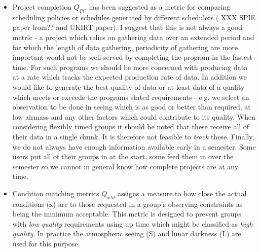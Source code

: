 \begin{itemize}
\item Project completion $Q_{PC}$ has been suggested as a metric for comparing scheduling policies or schedules generated by different schedulers ( XXX SPIE paper from?? and UKIRT paper). I suggest that this is not always a good metric - a project which relies on gathering data over an extended period and for which the length of data gathering, periodicity of gathering are more important would not be well served by completing the program in the fastest time. For such programs we should be more concerned with producing data at a rate which tracks the expected production rate of data. In addition we would like to generate the best quality of data or at least data of a quality which meets or exceeds the programs stated requirements - e.g. we select an observation to be done in seeing which is as good or better than required, at low airmass and any other factors which could contribute to its quality. When considering flexibly timed groups it should be noted that these receive all of their data in a single chunk. It is therefore not feasible to \emph{track} these. Finally, we do not always have enough information available early in a semester. Some users put all of their groups in at the start, some feed them in over the semester so we cannot in general know how complete projects are at any time.


\item Condition matching metrics $Q_{xM}$   assigns a measure to how close the actual conditions (x) are to those requested in a group's observing constraints as being the minimum acceptable. This metric is designed to prevent groups with \emph{low quality} requirements using up time which might be classified as \emph{high quality}. In practice the atmospheric seeing (S) and lunar darkness (L) are used for this purpose.


\end{itemize}
